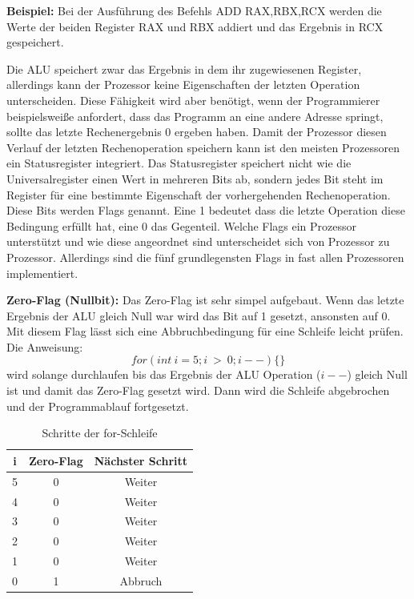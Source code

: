 \documentclass[12pt]{article}
\begin{document}
\noindent \textbf{Beispiel:} Bei der Ausführung des Befehls ADD RAX,RBX,RCX werden die Werte der beiden Register RAX und RBX addiert und das Ergebnis in RCX gespeichert.

Die ALU speichert zwar das Ergebnis in dem ihr zugewiesenen Register, allerdings kann der Prozessor keine Eigenschaften der letzten Operation unterscheiden. Diese Fähigkeit wird aber benötigt, wenn der Programmierer beispielsweiße anfordert, dass das Programm an eine andere Adresse springt, sollte das letzte Rechenergebnis 0 ergeben haben. Damit der Prozessor diesen Verlauf der letzten Rechenoperation speichern kann ist den meisten Prozessoren ein Statusregister integriert. Das Statusregister speichert nicht wie die Universalregister einen Wert in mehreren Bits ab, sondern jedes Bit steht im Register für eine bestimmte Eigenschaft der vorhergehenden Rechenoperation. Diese Bits werden Flags genannt. Eine 1 bedeutet dass die letzte Operation diese Bedingung erfüllt hat, eine 0 das Gegenteil. Welche Flags ein Prozessor unterstützt und wie diese angeordnet sind unterscheidet sich von Prozessor zu Prozessor. Allerdings sind die fünf grundlegensten Flags in fast allen Prozessoren implementiert.


\noindent \textbf{Zero-Flag (Nullbit):} Das Zero-Flag ist sehr simpel aufgebaut. Wenn das letzte Ergebnis der ALU gleich Null war wird das Bit auf 1 gesetzt, ansonsten auf 0. Mit diesem Flag lässt sich eine Abbruchbedingung für eine Schleife leicht prüfen. Die Anweisung: $$for(int \ i=5;i \ > \ 0;i--)\{\}$$ wird solange durchlaufen bis das Ergebnis der ALU Operation ($i--$) gleich Null ist und damit das Zero-Flag gesetzt wird. Dann wird die Schleife abgebrochen und der Programmablauf fortgesetzt.

\begin{table}[!htb]
\centering
\caption{Schritte der for-Schleife}
\label{forschleife}
\begin{tabular}{|c|c|c|}
\hline

i & Zero-Flag & Nächster Schritt \\ \hline
5 & 0         & Weiter           \\ \hline
4 & 0         & Weiter           \\ \hline
3 & 0         & Weiter           \\ \hline
2 & 0         & Weiter           \\ \hline
1 & 0         & Weiter           \\ \hline
0 & 1         & Abbruch          \\ \hline
\end{tabular}
\end{table}
\end{document}
